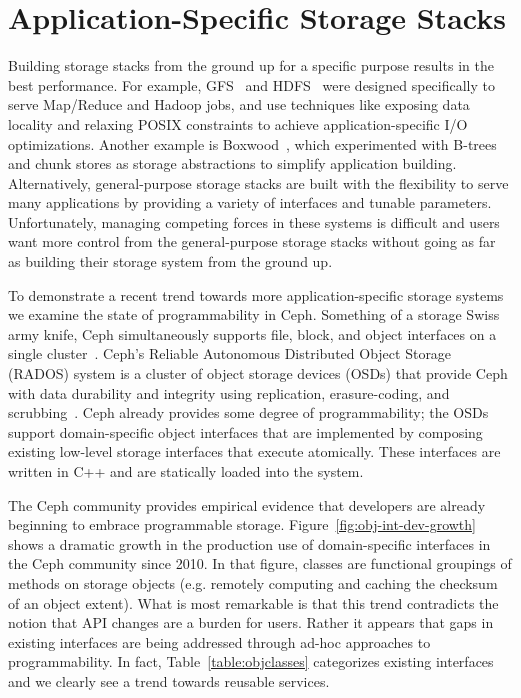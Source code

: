 \section{Application-Specific Storage Stacks}
\label{sec:application-specifc-storage-stacks}

Building storage stacks from the ground up for a specific purpose results in
the best performance. For example, GFS~\cite{ghemawat:sosp03} and
HDFS~\cite{shvachko:msst10} were designed specifically to serve Map/Reduce and
Hadoop jobs, and use techniques like exposing data locality and relaxing POSIX
constraints to achieve application-specific I/O optimizations. Another example
is Boxwood~\cite{maccormick:osdi04}, which experimented with B-trees and chunk
stores as storage abstractions to simplify application building.
Alternatively, general-purpose storage stacks are built with the flexibility to
serve many applications by providing a variety of interfaces and tunable
parameters.  Unfortunately, managing competing forces in these systems is
difficult and users want more control from the general-purpose storage stacks
without going as far as building their storage system from the ground up.

To demonstrate a recent trend towards more application-specific storage systems
we examine the state of programmability in Ceph. Something of a storage Swiss
army knife, Ceph simultaneously supports file, block, and object interfaces on
a single cluster~\cite{ceph_contributors_ceph_2010}. Ceph's Reliable Autonomous
Distributed Object Storage (RADOS) system is a cluster of object storage
devices (OSDs) that provide Ceph with data durability and integrity using
replication, erasure-coding, and scrubbing~\cite{weil_rados_2007}. Ceph already
provides some degree of programmability; the OSDs support domain-specific
object interfaces that are implemented by composing existing low-level storage
interfaces that execute atomically. These interfaces are written in C++ and are
statically loaded into the system.

The Ceph community provides empirical evidence that developers are already
beginning to embrace programmable storage. Figure~\ref{fig:obj-int-dev-growth}
shows a dramatic growth in the production use of domain-specific interfaces in
the Ceph community since 2010. In that figure, classes are functional groupings
of methods on storage objects (e.g. remotely computing and caching the checksum
of an object extent).  What is most remarkable is that this trend contradicts
the notion that API changes are a burden for users.  Rather it appears that
gaps in existing interfaces are being addressed through ad-hoc approaches to
programmability. In fact, Table~\ref{table:objclasses} categorizes existing
interfaces and we clearly see a trend towards reusable services.

